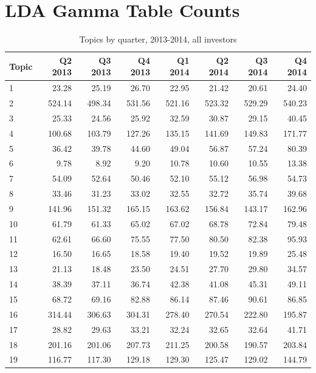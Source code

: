\chapter{LDA Gamma Table Counts}	
 
\begin{table}[]
\caption[Topics by Quarter, 2013-2014, All Investors]{Topics by quarter, 2013-2014, all investors}
		\small
	\begin{tabular}{l|rrrrrrr}
		Topic & Q2 2013 & Q3 2013 & Q4 2013 & Q1 2014 & Q2 2014 & Q3 2014 & Q4 2014 \\
		\hline
		1 & 23.28 & 25.19 & 26.70 & 22.95 & 21.42 & 20.61 & 24.40 \\
		2 & 524.14 & 498.34 & 531.56 & 521.16 & 523.32 & 529.29 & 540.23 \\
		3 & 25.33 & 24.56 & 25.92 & 32.59 & 30.87 & 29.15 & 40.45 \\
		4 & 100.68 & 103.79 & 127.26 & 135.15 & 141.69 & 149.83 & 171.77 \\
		5 & 36.42 & 39.78 & 44.60 & 49.04 & 56.87 & 57.24 & 80.39 \\
		6 & 9.78 & 8.92 & 9.20 & 10.78 & 10.60 & 10.55 & 13.38 \\
		7 & 54.09 & 52.64 & 50.46 & 52.10 & 55.12 & 56.98 & 54.73 \\
		8 & 33.46 & 31.23 & 33.02 & 32.55 & 32.72 & 35.74 & 39.68 \\
		9 & 141.96 & 151.32 & 165.15 & 163.62 & 156.84 & 143.17 & 162.96 \\
		10 & 61.79 & 61.33 & 65.02 & 67.02 & 68.78 & 72.84 & 79.48 \\
		11 & 62.61 & 66.60 & 75.55 & 77.50 & 80.50 & 82.38 & 95.93 \\
		12 & 16.50 & 16.65 & 18.58 & 19.40 & 19.52 & 19.89 & 25.48 \\
		13 & 21.13 & 18.48 & 23.50 & 24.51 & 27.70 & 29.80 & 34.57 \\
		14 & 38.39 & 37.11 & 36.74 & 42.38 & 41.08 & 45.31 & 49.11 \\
		15 & 68.72 & 69.16 & 82.88 & 86.14 & 87.46 & 90.61 & 86.85 \\
		16 & 314.44 & 306.63 & 304.31 & 278.40 & 270.54 & 222.80 & 195.87 \\
		17 & 28.82 & 29.63 & 33.21 & 32.24 & 32.65 & 32.64 & 41.71 \\
		18 & 201.16 & 201.06 & 207.73 & 211.25 & 200.58 & 190.57 & 203.84 \\
		19 & 116.77 & 117.30 & 129.18 & 129.30 & 125.47 & 129.02 & 144.79 \\

\end{tabular}
\end{table}
